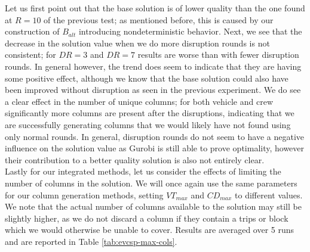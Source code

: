 \documentclass[]{article}
\begin{document}
Let us first point out that the base solution is of lower quality than the one found at $R=10$ of the previous test; as mentioned before, this is caused by our construction of $B_{alt}$ introducing nondeterministic behavior. Next, we see that the decrease in the solution value when we do more disruption rounds is not consistent; for $DR=3$ and $DR=7$ results are worse than with fewer disruption rounds. In general however, the trend does seem to indicate that they are having some positive effect, although we know that the base solution could also have been improved without disruption as seen in the previous experiment. We do see a clear effect in the number of unique columns; for both vehicle and crew significantly more columns are present after the disruptions, indicating that we are successfully generating columns that we would likely have not found using only normal rounds. In general, disruption rounds do not seem to have a negative influence on the solution value as Gurobi is still able to prove optimality, however their contribution to a better quality solution is also not entirely clear. \\

\noindent Lastly for our integrated methods, let us consider the effects of limiting the number of columns in the solution. We will once again use the same parameters for our column generation methods, setting $VT_{max}$ and $CD_{max}$ to different values. We note that the actual number of columns available to the solution may still be slightly higher, as we do not discard a column if they contain a trips or block which we would otherwise be unable to cover. Results are averaged over 5 runs and are reported in Table \ref{tab:evcsp-max-cols}.
\end{document}
